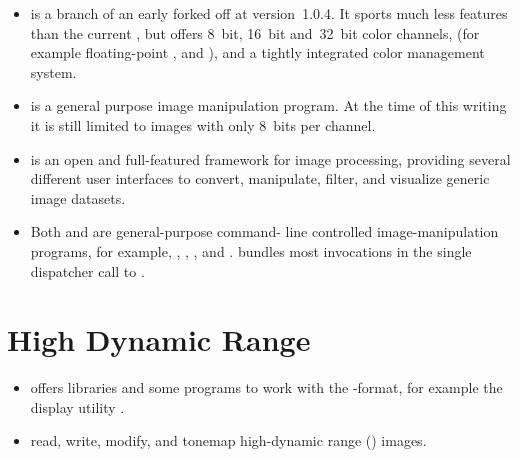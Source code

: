 \begin{itemize}
  \label{app:cinepaint}%
\item
   is a branch of an early 
  forked off at version~1.0.4.  It sports much less features than the current
  , but offers 8~bit, 16~bit and~32~bit color channels,  (for
  example floating-point , and ), and a tightly integrated color
  management system.

  \label{app:gimp}%
\item
   is a general purpose image manipulation program.  At
  the time of this writing it is still limited to images with only 8~bits per channel.

  \label{app:gmic}%
\item
   is an open and full-featured framework for
  image processing, providing several different user interfaces to convert, manipulate, filter,
  and visualize generic image datasets.

  \label{app:imagemagick}%
  \label{app:graphicsmagick}%
\item
  Both  and
   are general\hyp purpose command\hyp
  line controlled image\hyp manipulation programs, for example, ,
  , , and .  
  bundles most  invocations in the single dispatcher call to
  .
\end{itemize}


\section[High Dynamic Range]{\label{sec:high-dynamic-range}%
  High Dynamic Range}

\begin{itemize}
  \label{lib:openexr}%
\item
   offers libraries and some programs to work with the 
  -format, for example the  display utility .

  \label{app:psftools}%
\item
   read, write, modify, and tonemap high-dynamic range
  () images.
\end{itemize}


